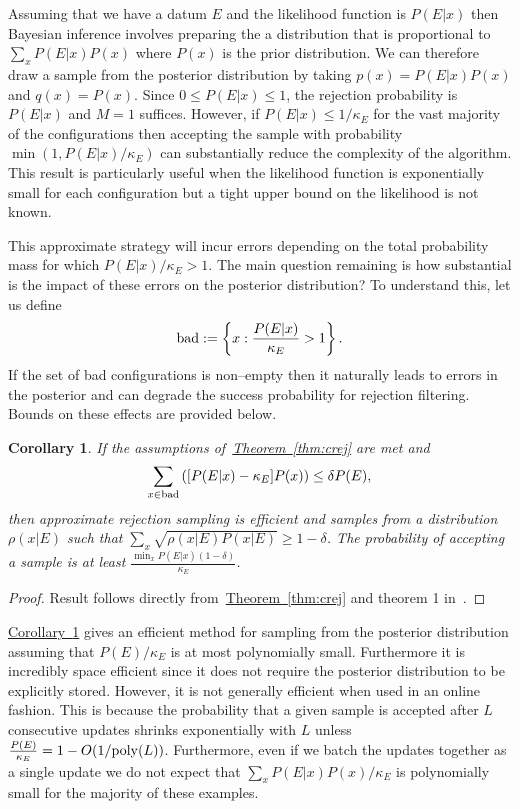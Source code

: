 \documentclass[twoside]{article}
\newtheorem{corollary}{Corollary}
\newcommand{\thm}[1]{\hyperref[thm:#1]{Theorem~\ref*{thm:#1}}}
\newcommand{\cor}[1]{\hyperref[cor:#1]{Corollary~\ref*{cor:#1}}}
\begin{document}
Assuming that we have a datum $E$ and the likelihood function is $P(E|x)$ then Bayesian inference
involves preparing the a distribution that is proportional to $\sum_x P(E|x) P(x)$ where $P(x)$ is the
prior distribution.  We can therefore draw a sample from the posterior distribution by taking
$p(x)=P(E|x)P(x)$ and $q(x)=P(x)$.  Since $0\le P(E|x)\le 1$, the rejection probability is $P(E|x)$ and
$M=1$ suffices.  However, if $P(E|x)\le 1/\kappa_E$ for the vast majority of the configurations then
accepting the sample with probability $\min(1,P(E|x)/\kappa_E)$  can substantially reduce the 
complexity of the algorithm.  This result is particularly useful when the likelihood function is exponentially
small for each configuration but a tight upper bound on the likelihood is not known.

This approximate strategy will incur errors depending on the total probability mass
for which $P(E|x)/\kappa_E >1$.   The main question remaining is how substantial is the
impact of these errors on the posterior distribution?  To understand this, let us define
\begin{equation}
{\rm bad} := \left\{x: \frac{P(E|x)}{\kappa_E} >1\right\}.
\end{equation}
If the set of bad configurations is non--empty then it naturally leads to errors in the posterior and
can degrade the success probability for rejection filtering.  Bounds on these effects are
provided below.

\begin{corollary}\label{cor:badalgorithm}
If the assumptions of~\thm{crej} are met and
$$\sum_{x\in {\rm bad}}  \left([P(E|x)-\kappa_E] P(x)\right) \le \delta P(E),$$
  then approximate rejection sampling is  efficient and samples from a distribution $\rho(x|E)$ such that ${\sum_x \sqrt{\rho(x|E) P(x|E)}} \ge 1-\delta$.
The probability of accepting a sample is at least $\frac{\min_x P(E|x) (1-\delta)}{\kappa_E}$.\label{thm:kappa}
\end{corollary}
\begin{proof}
Result follows directly from~\thm{crej} and theorem 1 in~\cite{WKGS15}.
\end{proof}

\cor{badalgorithm} gives an efficient method for sampling from the posterior distribution assuming that $P(E)/\kappa_E$ is at most polynomially small.  Furthermore it is incredibly space efficient since it does not require the posterior distribution to be explicitly stored.  However, it is not generally efficient when  used in an online fashion.  This is because the probability that a given sample is accepted after $L$ consecutive updates shrinks exponentially with $L$ unless $\frac{P(E)}{\kappa_E}=1-O(1/{\rm poly}(L))$.  Furthermore, even if we batch the updates together as a single update we do not expect that $\sum_x P(E|x) P(x) /\kappa_E$ is polynomially small for the majority of these examples.  
\end{document}
